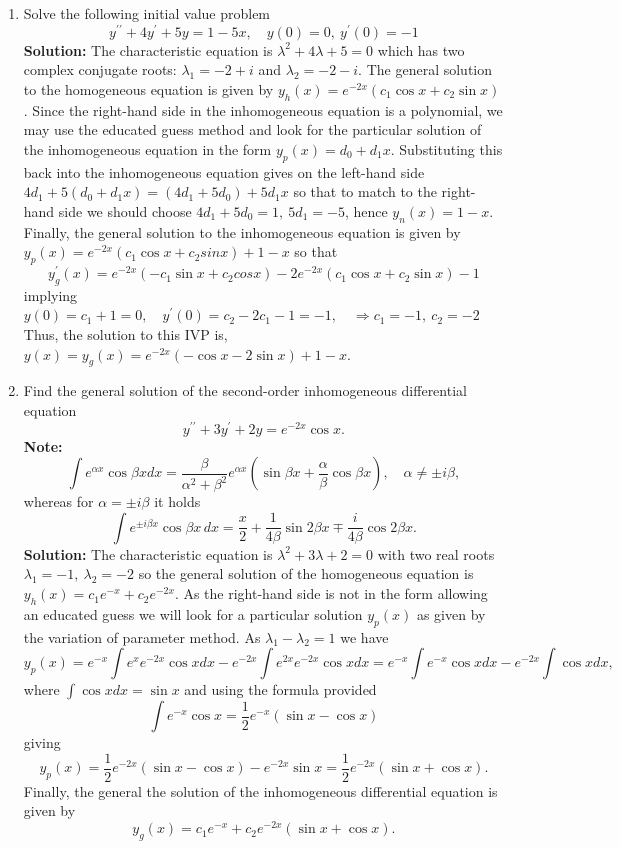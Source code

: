 \documentclass[11pt,a4paper,twoside]{article}
\begin{document}
\begin{enumerate}[\bfseries A.]
\begin{enumerate}[\bfseries 1)]
		\end{enumerate}
		\item Solve the following initial value problem
		$$
		y^{\prime\prime} + 4y^\prime + 5y = 1-5x,\quad y(0) = 0,\ y^\prime(0) = -1
		$$
		\textbf{Solution:} The characteristic equation is $\lambda^2 + 4\lambda + 5 = 0$ which has two complex conjugate roots: $\lambda_1 = −2 + i$ and $\lambda_2 = −2 − i$. The general solution to the homogeneous equation is given by $y_h(x) = e^{-2x}(c_1 \cos x + c_2 \sin x)$. Since the right-hand side in the inhomogeneous equation is a polynomial, we may use the educated guess method and look for the particular solution of the inhomogeneous equation in the form $y_p(x) = d_0 + d_1x$. Substituting this back into the inhomogeneous equation gives on the left-hand side $4d_1 + 5(d_0 + d_1x) = (4d_1 + 5d_0) + 5d_1x$ so that to match to the right-hand side we should choose $4d_1 + 5d_0 = 1,\ 5d_1 = −5$, hence $y_n(x) = 1 − x$. Finally, the general solution to the inhomogeneous equation is given by $y_p(x) = e^{-2x}(c_1 \cos x + c_2 sin x) + 1 − x$ so that
		$$
		y_g^\prime(x) = e^{-2x}(-c_1 \sin x + c_2 cos x) - 2e^{-2x}(c_1\cos x + c_2\sin x) - 1
		$$
		implying
		$y(0) = c_1 + 1 = 0,\quad y^\prime (0) = c_2 - 2c_1 - 1 = −1,\quad \Rightarrow c_1 = -1,\ c_2 = -2$
		Thus, the solution to this IVP is, $y(x) = y_g(x) = e^{−2x}(- \cos x - 2 \sin x) + 1 - x$.
		\item Find the general solution of the second-order inhomogeneous differential equation
		$$
		y^{\prime\prime} + 3y^\prime + 2y = e^{-2x}\cos x.
		$$
		\textbf{Note:}
		$$
		\int e^{\alpha x}\cos \beta xdx = \frac{\beta}{\alpha^2 + \beta^2}e^{\alpha x}\left(\sin \beta x + \frac{\alpha}{\beta}\cos \beta x\right),\quad \alpha \neq \pm i\beta,
		$$
		whereas for $\alpha = \pm i\beta$ it holds
		$$
		\int e^{\pm i\beta x}\cos \beta x\, dx = \frac{x}{2}+\frac{1}{4\beta}\sin 2\beta x \mp \frac{i}{4\beta}\cos 2\beta x.
		$$
		\textbf{Solution:} The characteristic equation is $\lambda^2 + 3\lambda + 2 = 0$ with two real roots $\lambda_1 = −1,\ \lambda_2 = −2$ so the general solution of the homogeneous equation is $y_h(x) = c_1e^{-x} + c_2e^{-2x}$. As the right-hand side is not in the form allowing an educated guess we will look for a particular solution $y_p(x)$ as given by the variation of parameter method. As $\lambda_1 - \lambda_2 = 1$ we have
		$$
		y_p(x)
		= e^{-x} \int e^xe^{-2x}\cos x dx - e^{-2x} \int e^{2x}e^{-2x}\cos x dx
		= e^{-x}\int e^{-x}\cos x dx - e^{-2x} \int \cos x dx,
		$$
		where $\int \cos x dx = \sin x$ and using the formula provided
		$$
		\int e^{-x}\cos x = \frac{1}{2}e^{-x}(\sin x - \cos x)
		$$
		giving
		$$
		y_p(x) = \frac{1}{2}e^{-2x}(\sin x - \cos x) - e^{-2x}\sin x = \frac{1}{2}e^{-2x}(\sin x + \cos x).
		$$
		Finally, the general the solution of the inhomogeneous differential equation is given by
		$$
		y_g(x) = c_1e^{-x} + c_2e^{-2x}(\sin x + \cos x).
		$$
	\end{enumerate}
\end{document}
